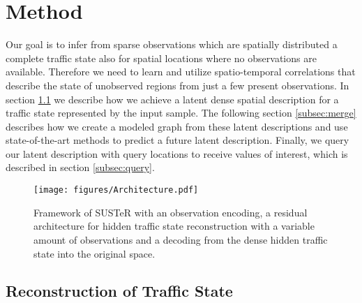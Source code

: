 \section{Method}
\label{sec:method}


Our goal is to infer from sparse observations which are spatially distributed a complete traffic state also for spatial locations where no observations are available.
Therefore we need to learn and utilize spatio-temporal correlations that describe the state of unobserved regions from just a few present observations.
In section \ref{subsec:imagine} we describe how we achieve a latent dense spatial description for a traffic state represented by the input sample. 
The following section \ref{subsec:merge} describes how we create a modeled graph from these latent descriptions and use state-of-the-art methods to predict a future latent description. 
Finally, we query our latent description with query locations to receive values of interest, which is described in section \ref{subsec:query}.

\begin{figure*}
    \centering    \texttt{[image: figures/Architecture.pdf]}
    \caption{Framework of SUSTeR with an observation encoding, a residual architecture for hidden traffic state reconstruction with a variable amount of observations and a decoding from the dense hidden traffic state into the original space.}
    \label{fig:architecture}
\end{figure*}



\subsection{Reconstruction of Traffic State}
\label{subsec:imagine}


